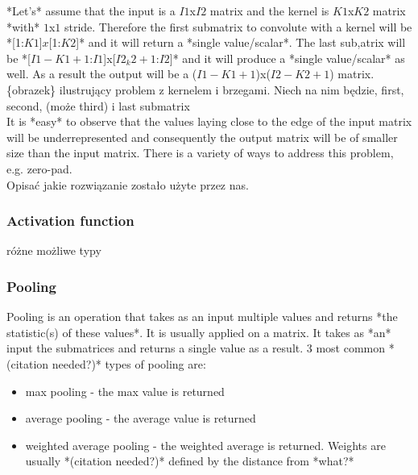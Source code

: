 \documentclass[a4paper,10pt]{report}
\begin{document}
	  *Let's* assume that the input is a $I1$x$I2$ matrix and the kernel is $K1$x$K2$ matrix *with* $1$x$1$ stride. Therefore the first submatrix to convolute with a kernel will be *[1:$K1$]$x$[1:$K2$]* and it will return a *single value/scalar*. The last sub,atrix will be *[$I1-K1+1$:$I1$]x[$I2_k2+1$:$I2$]* and it will produce a  *single value/scalar* as well. As a result the output will be a ($I1-K1+1$)x($I2-K2+1$) matrix.\\
	  
	  \{obrazek\} ilustrujący problem z kernelem i brzegami. Niech na nim będzie, first, second, (może third) i last submatrix\\
	  
	  It is *easy* to observe that the values laying close to the edge of the input matrix will be underrepresented and consequently the output matrix will be of smaller size than the input matrix. There is a variety of ways to address this problem, e.g. zero-pad.\\
	  
	  
	  Opisać jakie rozwiązanie zostało użyte przez nas. %
	
	\subsubsection{Activation function} %
	  różne możliwe typy
	
	\subsubsection{Pooling} %
	  Pooling is an operation that takes as an input multiple values and returns *the statistic(s) of these values*. It is usually applied on a matrix. It takes as *an* input the submatrices and returns a single value as a result. 3 most common *(citation needed?)* types of pooling are:
	  \begin{itemize}
	   \item max pooling - the max value is returned
	   \item average pooling - the average value is returned
	   \item weighted average pooling - the weighted average is returned. Weights are usually *(citation needed?)* defined by the distance from *what?*
	  \end{itemize}
	  
\end{document}
